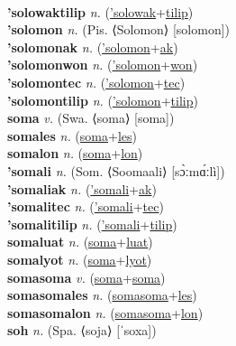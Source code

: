  \label{'solowaktec} \\
\textbf{'solowaktilip} \textit{n.} (\hyperref['solowak]{'solowak}+\hyperref[tilip]{tilip})
 \label{'solowaktilip} \\
\textbf{'solomon} \textit{n.} (Pis. ⟨Solomon⟩ [solomon])
 \label{'solomon} \\
\textbf{'solomonak} \textit{n.} (\hyperref['solomon]{'solomon}+\hyperref[ak]{ak})
 \label{'solomonak} \\
\textbf{'solomonwon} \textit{n.} (\hyperref['solomon]{'solomon}+\hyperref[won]{won})
 \label{'solomonwon} \\
\textbf{'solomontec} \textit{n.} (\hyperref['solomon]{'solomon}+\hyperref[tec]{tec})
 \label{'solomontec} \\
\textbf{'solomontilip} \textit{n.} (\hyperref['solomon]{'solomon}+\hyperref[tilip]{tilip})
 \label{'solomontilip} \\
\textbf{soma} \textit{v.} (Swa. ⟨soma⟩ [soma])
 \label{soma} \\
\textbf{somales} \textit{n.} (\hyperref[soma]{soma}+\hyperref[les]{les})
 \label{somales} \\
\textbf{somalon} \textit{n.} (\hyperref[soma]{soma}+\hyperref[lon]{lon})
 \label{somalon} \\
\textbf{'somali} \textit{n.} (Som. ⟨Soomaali⟩ [sɔ̀ːmɑ́ːlì])
 \label{'somali} \\
\textbf{'somaliak} \textit{n.} (\hyperref['somali]{'somali}+\hyperref[ak]{ak})
 \label{'somaliak} \\
\textbf{'somalitec} \textit{n.} (\hyperref['somali]{'somali}+\hyperref[tec]{tec})
 \label{'somalitec} \\
\textbf{'somalitilip} \textit{n.} (\hyperref['somali]{'somali}+\hyperref[tilip]{tilip})
 \label{'somalitilip} \\
\textbf{somaluat} \textit{n.} (\hyperref[soma]{soma}+\hyperref[luat]{luat})
 \label{somaluat} \\
\textbf{somalyot} \textit{n.} (\hyperref[soma]{soma}+\hyperref[lyot]{lyot})
 \label{somalyot} \\
\textbf{somasoma} \textit{v.} (\hyperref[soma]{soma}+\hyperref[soma]{soma})
 \label{somasoma} \\
\textbf{somasomales} \textit{n.} (\hyperref[somasoma]{somasoma}+\hyperref[les]{les})
 \label{somasomales} \\
\textbf{somasomalon} \textit{n.} (\hyperref[somasoma]{somasoma}+\hyperref[lon]{lon})
 \label{somasomalon} \\
\textbf{soh} \textit{n.} (Spa. ⟨soja⟩ [ˈsoxa])
